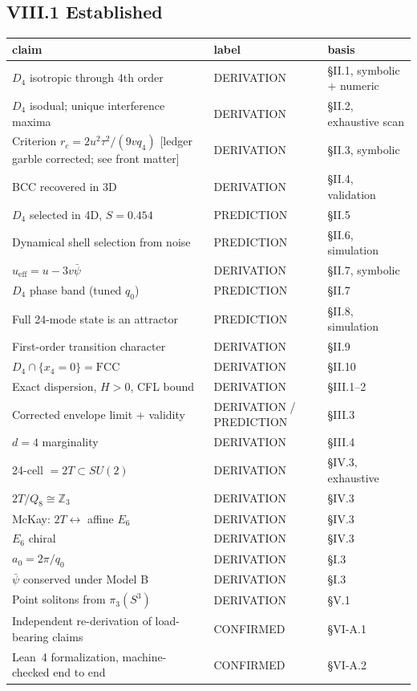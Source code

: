 \documentclass[11pt,a4paper]{article}
\begin{document}
\subsection{VIII.1 Established}
\begin{center}
\begin{tabular}{lll}
\toprule
claim & label & basis \\
\midrule
$D_4$ isotropic through 4th order & DERIVATION & \S II.1, symbolic + numeric \\
$D_4$ isodual; unique interference maxima & DERIVATION & \S II.2, exhaustive scan \\
Criterion $r_c = 2u^2\tau^2/(9vq_4)$ [ledger garble corrected; see front matter] & DERIVATION & \S II.3, symbolic \\
BCC recovered in 3D & DERIVATION & \S II.4, validation \\
$D_4$ selected in 4D, $S = 0.454$ & PREDICTION & \S II.5 \\
Dynamical shell selection from noise & PREDICTION & \S II.6, simulation \\
$u_{\mathrm{eff}} = u - 3v\bar{\psi}$ & DERIVATION & \S II.7, symbolic \\
$D_4$ phase band (tuned $q_0$) & PREDICTION & \S II.7 \\
Full 24-mode state is an attractor & PREDICTION & \S II.8, simulation \\
First-order transition character & DERIVATION & \S II.9 \\
$D_4 \cap \{x_4 = 0\} = \mathrm{FCC}$ & DERIVATION & \S II.10 \\
Exact dispersion, $H > 0$, CFL bound & DERIVATION & \S III.1--2 \\
Corrected envelope limit + validity & DERIVATION / PREDICTION & \S III.3 \\
$d = 4$ marginality & DERIVATION & \S III.4 \\
24-cell $= 2T \subset SU(2)$ & DERIVATION & \S IV.3, exhaustive \\
$2T/Q_8 \cong \mathbb{Z}_3$ & DERIVATION & \S IV.3 \\
McKay: $2T \leftrightarrow$ affine $E_6$ & DERIVATION & \S IV.3 \\
$E_6$ chiral & DERIVATION & \S IV.3 \\
$a_0 = 2\pi/q_0$ & DERIVATION & \S I.3 \\
$\bar{\psi}$ conserved under Model B & DERIVATION & \S I.3 \\
Point solitons from $\pi_3(S^3)$ & DERIVATION & \S V.1 \\
Independent re-derivation of load-bearing claims & CONFIRMED & \S VI-A.1 \\
Lean~4 formalization, machine-checked end to end & CONFIRMED & \S VI-A.2 \\
\bottomrule
\end{tabular}
\end{center}
\end{document}
